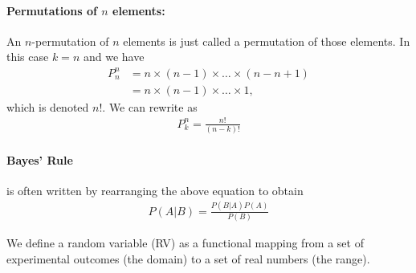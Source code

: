 \paragraph{Permutations of $n$ elements:} An $n$-permutation of $n$ elements is just called a permutation of those elements. In this case $k=n$ and we have
\begin{align*}
	P^n_n &= n\times (n-1)\times \dots \times (n-n+1)\\
		  &= n\times (n-1)\times \dots \times 1,
\end{align*}
which is denoted $n!$. We can rewrite as 
\begin{align*}
	P^n_k = \frac{n!}{(n-k)!}
\end{align*}


\paragraph{Bayes' Rule }is often written by rearranging the above equation to obtain 
\begin{align*}
	P(A|B) = \frac{P(B|A)P(A)}{P(B)}
\end{align*}

We define a random variable (RV) as a functional mapping from a set of experimental outcomes (the domain) to a set of real numbers (the range).


